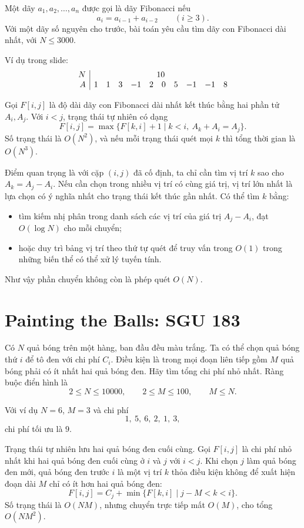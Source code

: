 \documentclass[11pt]{article}
\begin{document}
Một dãy $a_1,a_2,\ldots,a_n$ được gọi là dãy Fibonacci nếu
\[
  a_i=a_{i-1}+a_{i-2}\qquad (i\ge 3).
\]
Với một dãy số nguyên cho trước, bài toán yêu cầu tìm dãy con Fibonacci dài
nhất, với $N\le 3000$.

Ví dụ trong slide:
\[
\begin{array}{r|rrrrrrrrrr}
N & \multicolumn{10}{c}{10}\\
A & 1&1&3&-1&2&0&5&-1&-1&8
\end{array}
\]

Gọi $F[i,j]$ là độ dài dãy con Fibonacci dài nhất kết thúc bằng hai phần tử
$A_i,A_j$. Với $i<j$, trạng thái tự nhiên có dạng
\[
  F[i,j]=\max\{F[k,i]+1\mid k<i,\ A_k+A_i=A_j\}.
\]
Số trạng thái là $O(N^2)$, và nếu mỗi trạng thái quét mọi $k$ thì tổng thời
gian là $O(N^3)$.

Điểm quan trọng là với cặp $(i,j)$ đã cố định, ta chỉ cần tìm vị trí $k$ sao
cho $A_k=A_j-A_i$. Nếu cần chọn trong nhiều vị trí có cùng giá trị, vị trí lớn
nhất là lựa chọn có ý nghĩa nhất cho trạng thái kết thúc gần nhất. Có thể tìm
$k$ bằng:
\begin{itemize}
  \item tìm kiếm nhị phân trong danh sách các vị trí của giá trị $A_j-A_i$,
        đạt $O(\log N)$ cho mỗi chuyển;
  \item hoặc duy trì bảng vị trí theo thứ tự quét để truy vấn trong $O(1)$
        trong những biến thể có thể xử lý tuyến tính.
\end{itemize}
Như vậy phần chuyển không còn là phép quét $O(N)$.

\section{Painting the Balls: SGU 183}

Có $N$ quả bóng trên một hàng, ban đầu đều màu trắng. Ta có thể chọn quả bóng
thứ $i$ để tô đen với chi phí $C_i$. Điều kiện là trong mọi đoạn liên tiếp
gồm $M$ quả bóng phải có ít nhất hai quả bóng đen. Hãy tìm tổng chi phí nhỏ
nhất. Ràng buộc điển hình là
\[
  2\le N\le 10000,\qquad 2\le M\le 100,\qquad M\le N.
\]

Với ví dụ $N=6$, $M=3$ và chi phí
\[
  1,\ 5,\ 6,\ 2,\ 1,\ 3,
\]
chi phí tối ưu là $9$.

Trạng thái tự nhiên lưu hai quả bóng đen cuối cùng. Gọi $F[i,j]$ là chi phí
nhỏ nhất khi hai quả bóng đen cuối cùng ở $i$ và $j$ với $i<j$. Khi chọn $j$
làm quả bóng đen mới, quả bóng đen trước $i$ là một vị trí $k$ thỏa điều kiện
không để xuất hiện đoạn dài $M$ chỉ có ít hơn hai quả bóng đen:
\[
  F[i,j]=C_j+\min\{F[k,i]\mid j-M<k<i\}.
\]
Số trạng thái là $O(NM)$, nhưng chuyển trực tiếp mất $O(M)$, cho tổng
$O(NM^2)$.
\end{document}
